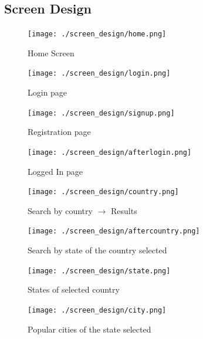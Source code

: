 \documentclass[11pt]{article}
\begin{document}
\subsection{Screen Design}
\begin{figure}[ht!]
\hfill\texttt{[image: ./screen\_design/home.png]}\hspace*{\fill}
\caption{Home Screen}
\end{figure}

\begin{figure}[ht!]
\hfill\texttt{[image: ./screen\_design/login.png]}\hspace*{\fill}
\caption{Login page}
\end{figure}

\begin{figure}[ht!]
\hfill\texttt{[image: ./screen\_design/signup.png]}\hspace*{\fill}
\caption{Registration page}
\end{figure}

\begin{figure}[ht!]
\hfill\texttt{[image: ./screen\_design/afterlogin.png]}\hspace*{\fill}
\caption{Logged In page}
\end{figure}

\begin{figure}[ht!]
\hfill\texttt{[image: ./screen\_design/country.png]}\hspace*{\fill}
\caption{Search by country $\rightarrow$ Results}
\end{figure}

\begin{figure}[ht!]
\hfill\texttt{[image: ./screen\_design/aftercountry.png]}\hspace*{\fill}
\caption{Search by state of the country selected}
\end{figure}

\begin{figure}[ht!]
\hfill\texttt{[image: ./screen\_design/state.png]}\hspace*{\fill}
\caption{States of selected country}
\end{figure}

\begin{figure}[ht!]
\hfill\texttt{[image: ./screen\_design/city.png]}\hspace*{\fill}
\caption{Popular cities of the state selected}
\end{figure}
\end{document}
